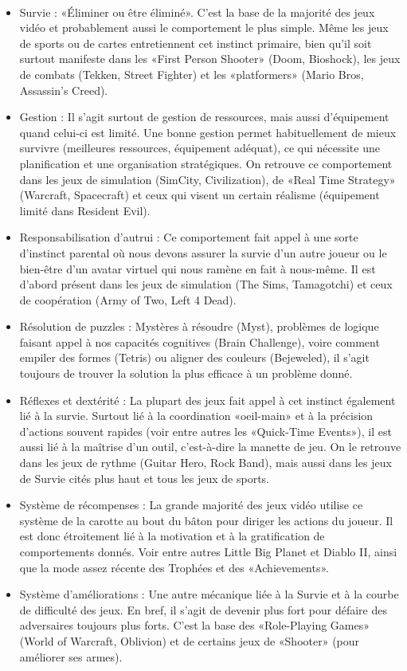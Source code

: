 \paragraph{}
\begin{itemize}
	\item {Survie :} «Éliminer ou être éliminé». C’est la base de la majorité des jeux vidéo et probablement
aussi le comportement le plus simple. Même les jeux de sports ou de cartes entretiennent cet instinct
primaire, bien qu’il soit surtout manifeste dans les «First Person Shooter» (Doom, Bioshock), les
jeux de combats (Tekken, Street Fighter) et les «platformers» (Mario Bros, Assassin’s Creed).
	\item {Gestion :} Il s’agit surtout de gestion de ressources, mais aussi d’équipement quand celui-ci est
limité. Une bonne gestion permet habituellement de mieux survivre (meilleures ressources,
équipement adéquat), ce qui nécessite une planification et une organisation stratégiques. On
retrouve ce comportement dans les jeux de simulation (SimCity, Civilization), de «Real Time
Strategy» (Warcraft, Spacecraft) et ceux qui visent un certain réalisme (équipement limité dans
Resident Evil).
	\item {Responsabilisation d’autrui :} Ce comportement fait appel à une sorte d’instinct parental où nous
devons assurer la survie d’un autre joueur ou le bien-être d’un avatar virtuel qui nous ramène en fait
à nous-même. Il est d’abord présent dans les jeux de simulation (The Sims, Tamagotchi) et ceux de
coopération (Army of Two, Left 4 Dead).
	\item {Résolution de puzzles :} Mystères à résoudre (Myst), problèmes de logique faisant appel à nos
capacités cognitives (Brain Challenge), voire comment empiler des formes (Tetris) ou aligner des
couleurs (Bejeweled), il s’agit toujours de trouver la solution la plus efficace à un problème donné.
	\item {Réflexes et dextérité :} La plupart des jeux fait appel à cet instinct également lié à la survie.
Surtout lié à la coordination «oeil-main» et à la précision d’actions souvent rapides (voir entre autres
les «Quick-Time Events»), il est aussi lié à la maîtrise d’un outil, c’est-à-dire la manette de jeu. On
le retrouve dans les jeux de rythme (Guitar Hero, Rock Band), mais aussi dans les jeux de Survie
cités plus haut et tous les jeux de sports.
	\item {Système de récompenses }: La grande majorité des jeux vidéo utilise ce système de la carotte au
bout du bâton pour diriger les actions du joueur. Il est donc étroitement lié à la motivation et à la
gratification de comportements donnés. Voir entre autres Little Big Planet et Diablo II, ainsi que la
mode assez récente des Trophées et des «Achievements».
	\item {Système d’améliorations : }Une autre mécanique liée à la Survie et à la courbe de difficulté des
jeux. En bref, il s’agit de devenir plus fort pour défaire des adversaires toujours plus forts. C’est la
base des «Role-Playing Games» (World of Warcraft, Oblivion) et de certains jeux de «Shooter»
(pour améliorer ses armes).
\end{itemize}
